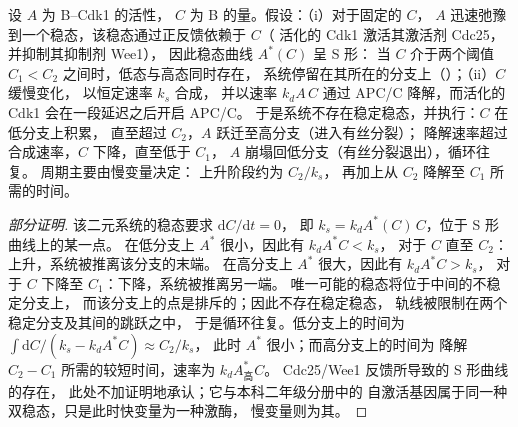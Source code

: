 \begin{theorem}[开关与延迟制动构成振子]\label{thm:b3:cell-cycle-apoptosis:oscillator}
设 $A$ 为 B–Cdk1 的活性，
$C$ 为 B 的量。假设：（i）对于固定的 $C$，
$A$ 迅速弛豫到一个稳态，该稳态通过正反馈依赖于 $C$（
活化的 Cdk1 激活其激活剂 Cdc25，并抑制其抑制剂 Wee1），
因此稳态曲线 $A^{*}(C)$ 呈 S 形：
当 $C$ 介于两个阈值 $C_{1} < C_{2}$ 之间时，低态与高态同时存在，
系统停留在其所在的分支上（\emph{}）；（ii）$C$ 缓慢变化，
以恒定速率 $k_{s}$ 合成，
并以速率 $k_{d}A\,C$ 通过 APC/C 降解，而活化的 Cdk1 会在一段延迟之后开启 APC/C。
于是系统不存在稳定稳态，并执行\emph{}：$C$ 在低分支上积累，
直至超过 $C_{2}$，$A$ 跃迁至高分支（进入有丝分裂）；
降解速率超过合成速率，$C$ 下降，直至低于 $C_{1}$，
$A$ 崩塌回低分支（有丝分裂退出），循环往复。
周期主要由慢变量决定：
上升阶段约为 $C_{2}/k_{s}$，
再加上从 $C_{2}$ 降解至 $C_{1}$ 所需的时间。
\end{theorem}
\begin{proof}[部分证明]
该二元系统的稳态要求 $\mathrm{d}C/\mathrm{d}t = 0$，
即 $k_{s} = k_{d}A^{*}(C)\,C$，位于 S 形曲线上的某一点。
在低分支上 $A^{*}$ 很小，因此有 $k_{d}A^{*}C < k_{s}$，
对于 $C$ 直至 $C_{2}$：上升，系统被推离该分支的末端。
在高分支上 $A^{*}$ 很大，因此有 $k_{d}A^{*}C > k_{s}$，
对于 $C$ 下降至 $C_{1}$：下降，系统被推离另一端。
唯一可能的稳态将位于中间的不稳定分支上，
而该分支上的点是排斥的；因此不存在稳定稳态，
轨线被限制在两个稳定分支及其间的跳跃之中，
于是循环往复。低分支上的时间为
$\int \mathrm{d}C/(k_{s} - k_{d}A^{*}C) \approx C_{2}/k_{s}$，
此时 $A^{*}$ 很小；而高分支上的时间为
降解 $C_{2} - C_{1}$ 所需的较短时间，速率为 $k_{d}A^{*}_{\text{高}}C$。
Cdc25/Wee1 反馈所导致的 S 形曲线的存在，
此处不加证明地承认；它与本科二年级分册中的
自激活基因属于同一种双稳态，只是此时快变量为一种激酶，
慢变量则为其。
\end{proof}

